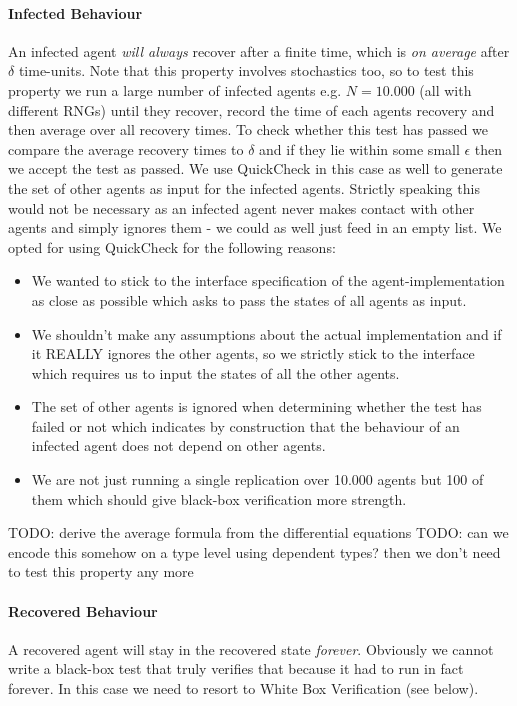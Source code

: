 \paragraph{Infected Behaviour}
An infected agent \textit{will always} recover after a finite time, which is \textit{on average} after $\delta$ time-units. Note that this property involves stochastics too, so to test this property we run a large number of infected agents e.g. $N = 10.000$ (all with different RNGs) until they recover, record the time of each agents recovery and then average over all recovery times. To check whether this test has passed we compare the average recovery times to $\delta$ and if they lie within some small $\epsilon$ then we accept the test as passed.
We use QuickCheck in this case as well to generate the set of other agents as input for the infected agents. Strictly speaking this would not be necessary as an infected agent never makes contact with other agents and simply ignores them - we could as well just feed in an empty list. We opted for using QuickCheck for the following reasons:

\begin{itemize}
	\item We wanted to stick to the interface specification of the agent-implementation as close as possible which asks to pass the states of all agents as input.
	\item We shouldn't make any assumptions about the actual implementation and if it REALLY ignores the other agents, so we strictly stick to the interface which requires us to input the states of all the other agents.
	\item The set of other agents is ignored when determining whether the test has failed or not which indicates by construction that the behaviour of an infected agent does not depend on other agents.
	\item We are not just running a single replication over 10.000 agents but 100 of them which should give black-box verification more strength.
\end{itemize}

TODO: derive the average formula from the differential equations
TODO: can we encode this somehow on a type level using dependent types? then we don't need to test this property any more

\paragraph{Recovered Behaviour}
A recovered agent will stay in the recovered state \textit{forever}. Obviously we cannot write a black-box test that truly verifies that because it had to run in fact forever. In this case we need to resort to White Box Verification (see below).

